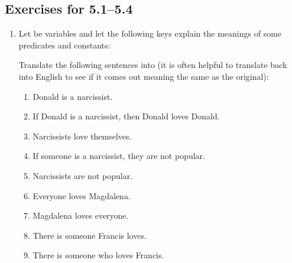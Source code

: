 
\subsection*{Exercises for 5.1--5.4}
\begin{enumerate}
 \item

  Let  be variables and let the following keys explain the meanings of 
  some predicates and constants:

 Translate the following sentences into \lL[Q] (it is often helpful to translate 
 back into English to see if it comes out meaning the same as the original):

  \begin{enumerate}

   \item Donald is a narcissist.

   \item If Donald is a narcissist, then Donald loves Donald.

   \item Narcissists love themselves.

   \item If someone is a narcissist, they are not popular.

   \item Narcissists are not popular.

   \item Everyone loves Magdalena.

   \item Magdalena loves everyone.

   \item There is someone Francis loves.

   \item There is someone who loves Francis.


\end{enumerate}
\end{enumerate}
